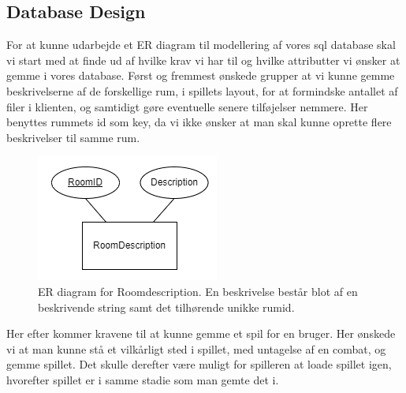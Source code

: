 \subsection{Database Design}
For at kunne udarbejde et ER diagram til modellering af vores sql database skal vi start med at finde ud af hvilke krav vi har til og hvilke attributter vi ønsker at gemme i vores database.
Først og fremmest ønskede grupper at vi kunne gemme beskrivelserne af de forskellige rum, i spillets layout, for at formindske antallet af filer i klienten, og samtidigt gøre eventuelle senere tilføjelser nemmere. Her benyttes rummets id som key, da vi ikke ønsker at man skal kunne oprette flere beskrivelser til samme rum.

\begin{figure}[H]
\centering
\includegraphics[width = \textwidth]{02-Body/Images/ER-RoomDescription.PNG}
\caption{ER diagram for Roomdescription. En beskrivelse består blot af en beskrivende string samt det tilhørende unikke rumid.}
\label{fig:ER-Roomdescription}
\end{figure}

Her efter kommer kravene til at kunne gemme et spil for en bruger. Her ønskede vi at man kunne stå et vilkårligt sted i spillet, med untagelse af en combat, og gemme spillet. Det skulle derefter være muligt for spilleren at loade spillet igen, hvorefter spillet er i samme stadie som man gemte det i.

